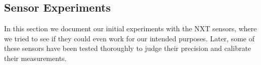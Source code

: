 \subsection{Sensor Experiments}
In this section we document our initial experiments with the NXT sensors, where we tried to see if they could even work for our intended purposes. Later, some of these sensors have been tested thoroughly to judge their precision and calibrate their measurements.

